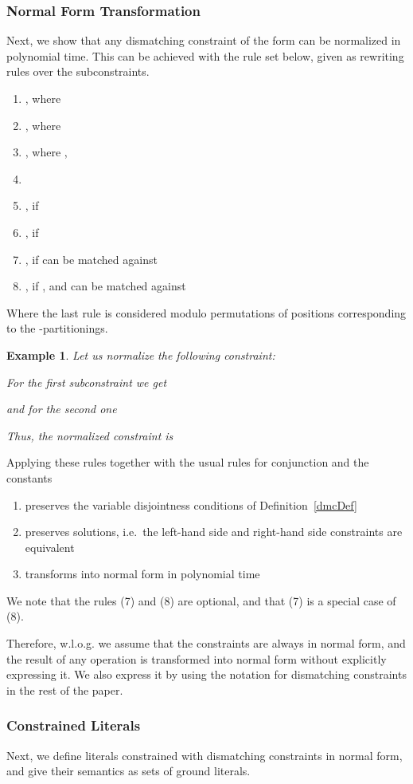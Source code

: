 \documentclass[a4paper]{article}
\newtheorem{example}[defi]{Example}
\begin{document}
\subsubsection*{Normal Form Transformation}
Next, we show that any dismatching constraint of the form  
can be normalized in polynomial time. This can be achieved with the rule set below, given as rewriting rules over the subconstraints.

\begin{enumerate}
	\item , 
		where 
	\item , 
		where 
	\item , 
		where , 
	\item 
	\item , 
		if 
	\item , 
		if 
	\item , 
		if  can be matched against 
	\item ,
		if , and  can be matched against  
		
\end{enumerate}
Where the last rule is considered modulo permutations of positions corresponding to the -partitionings.
\begin{example} Let us normalize the following constraint: 

For the first subconstraint we get

and for the second one

Thus, the normalized constraint is

\end{example}
Applying these rules together with the usual rules for conjunction and the constants 
\begin{enumerate}
	\item preserves the variable disjointness conditions of Definition~\ref{dmcDef}
	\item preserves solutions, i.e.\ the left-hand side and right-hand side constraints are equivalent
	\item transforms  into normal form in polynomial time \end{enumerate}
We note that the rules (7) and (8) are optional, and that (7) is a special case of (8).


Therefore, w.l.o.g. we assume that the constraints are always in normal form, and 
the result of any operation is transformed into normal form without explicitly expressing it. 
We also express it by using the notation  
for dismatching constraints in the rest of the paper.
\subsubsection*{Constrained Literals}
Next, we define literals constrained with dismatching constraints in normal form, and give their semantics as sets of 
ground literals.
\end{document}
